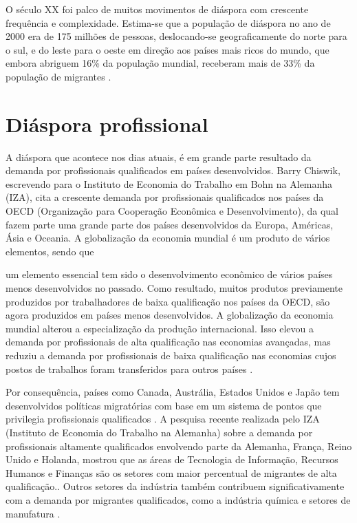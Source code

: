 \documentclass[12pt]{abntex2}
\begin{document}
O século XX foi palco de muitos movimentos de diáspora com crescente frequência e complexidade. Estima-se que a população de diáspora no ano de 2000 era de 175 milhões de pessoas, deslocando-se geograficamente do norte para o sul, e do leste para o oeste em direção aos países mais ricos do mundo, que embora abriguem 16\% da população mundial, receberam mais de 33\% da população de migrantes \cite[p. 26]{wan_diaspora_2011}.

\section{Diáspora profissional}

A diáspora que acontece nos dias atuais, é em grande parte resultado da demanda por profissionais qualificados em países desenvolvidos. Barry Chiswik, escrevendo para o Instituto de Economia do Trabalho em Bohn na Alemanha (IZA), cita a crescente demanda por profissionais qualificados nos países da OECD (Organização para Cooperação Econômica e Desenvolvimento), da qual fazem parte uma grande parte dos países desenvolvidos da Europa, Américas, Ásia e Oceania. A globalização da economia mundial é um produto de vários elementos, sendo que 

\begin{citacao} um elemento essencial tem sido o desenvolvimento econômico de vários países menos desenvolvidos no passado. Como resultado, muitos produtos previamente produzidos por trabalhadores de baixa qualificação nos países da OECD, são agora produzidos em países menos desenvolvidos. A globalização da economia mundial alterou a especialização da produção internacional. Isso elevou a demanda por profissionais de alta qualificação nas economias avançadas, mas reduziu a demanda por profissionais de baixa qualificação nas economias cujos postos de trabalhos foram transferidos para outros países \cite[p. 3]{chiswick_high_2005}. \end{citacao}

Por consequência, países como Canada, Austrália, Estados Unidos e Japão tem desenvolvidos políticas migratórias com base em um sistema de pontos que privilegia profissionais qualificados \cite[p. 6]{chiswick_high_2005}. A pesquisa recente realizada pelo IZA (Instituto de Economia do Trabalho na Alemanha) sobre a demanda por profissionais altamente qualificados envolvendo parte da Alemanha, França, Reino Unido e Holanda, mostrou que as áreas de Tecnologia de Informação, Recursos Humanos e Finanças são os setores com maior percentual de migrantes de alta qualificação.\cite[p. 7]{bauer_demand_2004}. Outros setores da indústria também contribuem significativamente com a demanda por migrantes qualificados, como a indústria química e setores de manufatura \cite[p. 18]{bauer_demand_2004}.
\end{document}
